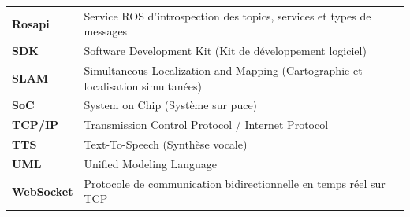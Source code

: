\begin{center}
\begin{tabularx}{\textwidth}{>{\bfseries}p{3cm}X}
Rosapi & Service ROS d'introspection des topics, services et types de messages \\

SDK & Software Development Kit (Kit de développement logiciel) \\

SLAM & Simultaneous Localization and Mapping (Cartographie et localisation simultanées) \\

SoC & System on Chip (Système sur puce) \\

TCP/IP & Transmission Control Protocol / Internet Protocol \\

TTS & Text-To-Speech (Synthèse vocale) \\

UML & Unified Modeling Language \\

WebSocket & Protocole de communication bidirectionnelle en temps réel sur TCP \\

\bottomrule
\end{tabularx}
\end{center}